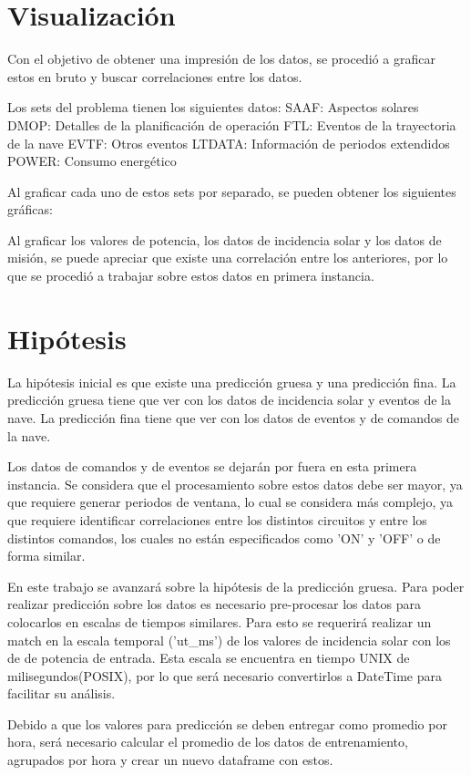 \documentclass[../Main.tex]{subfiles}
\begin{document}
\section{Visualización}
Con el objetivo de obtener una impresión de los datos, se procedió a graficar estos en bruto y buscar correlaciones entre los datos. 

Los sets del problema tienen los siguientes datos:
SAAF: Aspectos solares
DMOP: Detalles de la planificación de operación
FTL: Eventos de la trayectoria de la nave
EVTF: Otros eventos
LTDATA: Información de periodos extendidos
POWER: Consumo energético

Al graficar cada uno de estos sets por separado, se pueden obtener los siguientes gráficas:

Al graficar los valores de potencia, los datos de incidencia solar y los datos de misión, se puede apreciar que existe una correlación entre los anteriores, por lo que se procedió a trabajar sobre estos datos en primera instancia. 

\section{Hipótesis}
La hipótesis inicial es que existe una predicción gruesa y una predicción fina. La predicción gruesa tiene que ver con los datos de incidencia solar y eventos de la nave. La predicción fina tiene que ver con los datos de eventos y de comandos de la nave.

Los datos de comandos y de eventos se dejarán por fuera en esta primera instancia. Se considera que el procesamiento sobre estos datos debe ser mayor, ya que requiere generar periodos de ventana, lo cual se considera más complejo, ya que requiere identificar correlaciones entre los distintos circuitos y entre los distintos comandos, los cuales no están especificados como 'ON' y 'OFF' o de forma similar.

En este trabajo se avanzará sobre la hipótesis de la predicción gruesa. Para poder realizar predicción sobre los datos es necesario pre-procesar los datos para colocarlos en escalas de tiempos similares. Para esto se requerirá realizar un match en la escala temporal ('ut_ms') de los valores de incidencia solar con los de de potencia de entrada. Esta escala se encuentra en tiempo UNIX de milisegundos(POSIX), por lo que será necesario convertirlos a DateTime para facilitar su análisis.

Debido a que los valores para predicción se deben entregar como promedio por hora, será necesario calcular el promedio de los datos de entrenamiento, agrupados por hora y crear un nuevo dataframe con estos.
\end{document}
